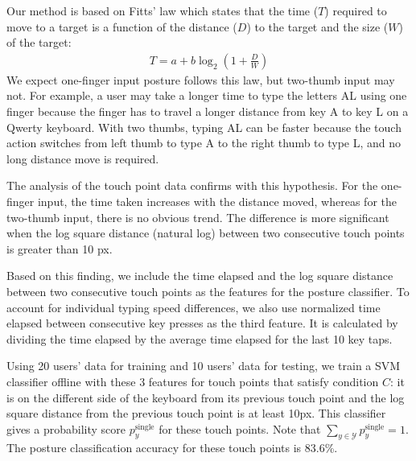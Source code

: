\documentclass{sigchi}
\begin{document}
Our method is based on Fitts' law which states that the time ($T$) required to 
move to a target is a function of the distance ($D$) to the target and the size ($W$) of the target:
\begin{align}
T = a + b\log_2(1 + \frac{D}{W})
\end{align}                                                  
We expect one-finger input posture follows this law,  but two-thumb input may 
not. For example, a user may take a longer time to type the letters AL using one
finger because the finger has to travel a longer distance from key A to key L on
a Qwerty keyboard. With two thumbs, typing AL can be faster because the touch 
action switches from left thumb to type A to the right thumb to type L, and no 
long distance move is required.

% 

The analysis of the touch point data confirms with this hypothesis. For the 
one-finger input, the time taken increases with the distance
moved, whereas for the two-thumb input, there is no obvious trend. The
difference is more significant when the log square distance (natural log)
between two consecutive touch points is greater than 10 px.

Based on this finding, we include the time elapsed and the log square distance
between two consecutive touch points as the features for the posture classifier. 
To account for individual typing speed differences, we also use normalized time 
elapsed between consecutive key presses as the third feature. It is calculated 
by dividing the time elapsed by the average time elapsed for the last 10 key
taps.

Using 20 users’ data for training and 10 users’ data for testing, we train a SVM classifier offline with these 3 features for touch points that satisfy condition $C$: it is 
on the different side of the keyboard from its previous touch point and the log square distance from the previous touch point is at least 10px. This classifier gives a probability score $p_y^{\text{single}}$ for these touch points. Note that $\displaystyle\sum_{y \in \mathcal{Y}}p_y^{\text{single}} = 1$. The posture classification accuracy for these touch points is 83.6\%.
 
\end{document}
